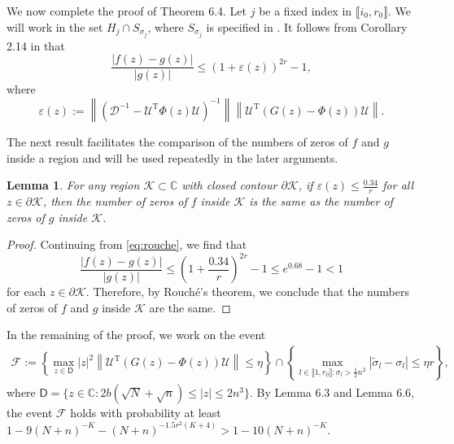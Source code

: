 \documentclass[reqno]{amsart}
\newcommand{\eps}{\varepsilon}
\newcommand{\T}{\mathrm{T}}
\theoremstyle{plain}
\newtheorem{lemma}[theorem]{Lemma}
\theoremstyle{definition}
\begin{document}

We now complete the proof of Theorem 6.4.  Let $j$ be a fixed index in $\llbracket i_0, r_0 \rrbracket$. We will work in the set $H_j \cap S_{\sigma_j}$, where $S_{\sigma_j}$ is specified in \cite[Eq. (35)]{Wang24}.  It follows from Corollary 2.14 in \cite{Ipsen} that 
\begin{equation} \label{eq:rouche}
	\frac{ |f(z) - g(z)|}{|g(z)|} \leq \left( 1 + \varepsilon(z) \right)^{2r} - 1, 
\end{equation} 
where
\[ \eps(z) := \left \| \left( \mathcal D^{-1} - \mathcal U^\T \Phi(z) \mathcal U \right)^{-1} \right \| \left\| \mathcal U^\T (G(z)-\Phi(z)) \mathcal U \right\|. \]

The next result facilitates the comparison of the numbers of zeros of $f$ and $g$ inside a region and will be used repeatedly in the later arguments. 
\begin{lemma}\label{lem:comparezero}
For any region $\mathcal K\subset \mathbb C$ with closed contour $\partial \mathcal K$, if $\eps(z) \le \frac{0.34}{r}$ for all $z\in \partial \mathcal K$, then the number of zeros of $f$ inside $\mathcal{K}$ is the same as the number of zeros of $g$ inside $\mathcal{K}$.
\end{lemma}
\begin{proof}
Continuing from \eqref{eq:rouche}, we find that
\begin{equation} \label{eq:rouchebnd}
	\frac{ |f(z) - g(z)|}{|g(z)|} \leq \left( 1 + \frac{0.34}{r} \right)^{2r} - 1 \leq e^{0.68} - 1 < 1 
\end{equation} 
for each $z \in \partial \mathcal K$.  Therefore, by Rouch\'{e}'s theorem, we conclude that the numbers of zeros of $f$ and $g$ inside $\mathcal{K}$ are the same.
\end{proof}

In the remaining of the proof, we work on the event
\begin{align}\label{eventF}
\mathcal F:=\left\{\max_{ z \in \mathsf D} |z|^2 \left\|  \mathcal U^\T \left(G(z)-\Phi(z) \right) \mathcal U \right\| \leq \eta \right\} \cap \left\{ \max_{l \in \llbracket 1, r_0\rrbracket : \sigma_l >\frac{1}{2}n^2} |\widetilde \sigma_l - \sigma_l |\le \eta r \right\},
\end{align}
where $\mathsf D= \{ z\in \mathbb C : 2b(\sqrt N + \sqrt n)\le |z| \le 2n^3\}.$ 
By Lemma 6.3 and Lemma 6.6, the event $\mathcal F$
 holds with probability at least $1-9(N+n)^{-K} - (N+n)^{-1.5r^2(K+4)} > 1- 10(N+n)^{-K}.$
\end{document}
